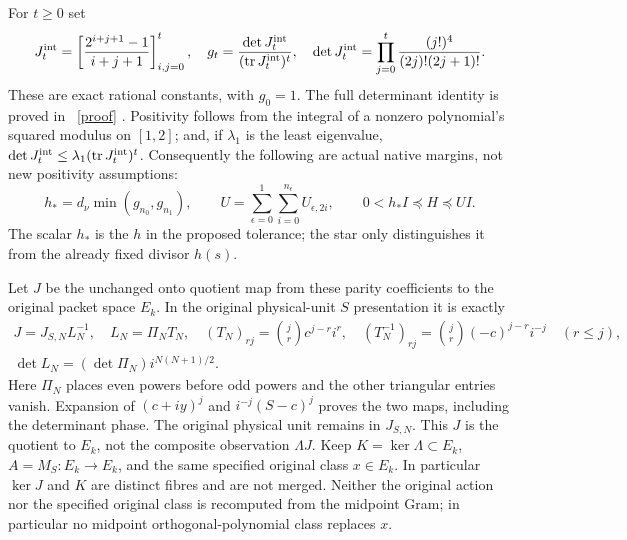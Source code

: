 \documentclass[11pt]{article}
\newcommand{\tr}{\operatorname{tr}}
\begin{document}
For $t\ge0$ set
\[
 J_t^{\rm int}=\left[\frac{2^{i+j+1}-1}{i+j+1}\right]_{i,j=0}^t,
 \quad g_t=\frac{\det J_t^{\rm int}}{(\tr J_t^{\rm int})^t},
 \quad
 \det J_t^{\rm int}=\prod_{j=0}^t
                   \frac{(j!)^4}{(2j)!(2j+1)!}.
\]
These are exact rational constants, with $g_0=1$. The full
determinant identity is proved in \cite{NP}%
~\href{https://github.com/KokunoYumeto/zeta-function-research-reader/blob/5992ad50c0f2a06921f1fcaded7b4e38097c0739/workbenches/splitzero-tandem/continuations/20260920-original-kernel-mixed-determinants/providers/NATIVE_MOMENT_PRECISION.tex\#L1}{[proof]}%
{}. Positivity follows
from the integral of a nonzero polynomial's squared modulus on
$[1,2]$; and, if $\lambda_1$ is the least eigenvalue,
$\det J_t^{\rm int}\le\lambda_1(\tr J_t^{\rm int})^t$.
Consequently the following are actual native margins, not new
positivity assumptions:
\begin{equation}\tag{MC2}\label{eq:margins}
 h_*=d_\nu\min(g_{n_0},g_{n_1}),\qquad
 U=\sum_{\epsilon=0}^1\sum_{i=0}^{n_\epsilon}U_{\epsilon,2i},
 \qquad 0<h_*I\preceq H\preceq UI.
\end{equation}
The scalar $h_*$ is the $h$ in the proposed tolerance; the star
only distinguishes it from the already fixed divisor $h(s)$.

Let $J$ be the unchanged onto quotient map from these parity
coefficients to the original packet space $E_k$. In the original
physical-unit $S$ presentation it is exactly
\begin{equation}\tag{MC3}\label{eq:Jmap}
 \begin{gathered}
 J=J_{S,N}L_N^{-1},\quad L_N=\Pi_NT_N,\quad
 (T_N)_{rj}=\binom jr c^{j-r}i^r,\quad
 (T_N^{-1})_{rj}=\binom jr(-c)^{j-r}i^{-j}\quad(r\le j),\\
 \det L_N=(\det\Pi_N)i^{N(N+1)/2}.
 \end{gathered}
\end{equation}
Here $\Pi_N$ places even powers before odd powers and the other
triangular entries vanish. Expansion of $(c+iy)^j$ and
$i^{-j}(S-c)^j$ proves the two maps, including the determinant
phase. The original physical unit remains in $J_{S,N}$.
This $J$ is the quotient to $E_k$, not the composite observation
$\Lambda J$. Keep $K=\ker\Lambda\subset E_k$,
$A=M_S:E_k\to E_k$, and the same specified original class
$x\in E_k$. In particular $\ker J$ and $K$ are distinct fibres
and are not merged.
Neither the original action nor the specified original class is
recomputed from the midpoint Gram; in particular no midpoint
orthogonal-polynomial class replaces $x$.
\end{document}
